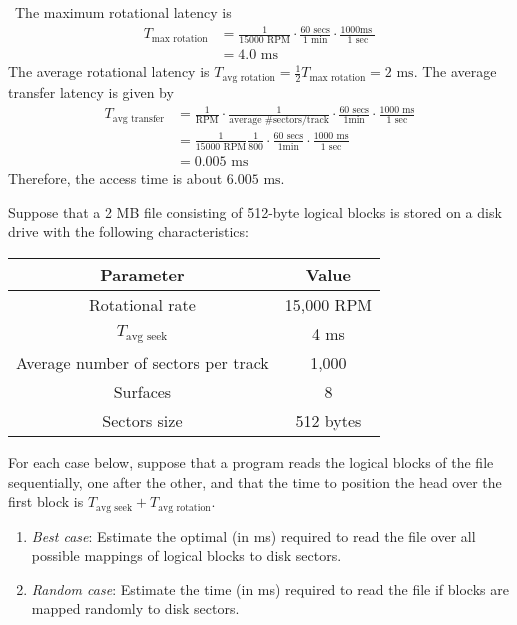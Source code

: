 \documentclass[12pt]{article}
\newenvironment{ex}[2][Exercise]{\begin{trivlist}
		\item[\hskip \labelsep {\bfseries #1}\hskip \labelsep {\bfseries #2.}]}{\end{trivlist}}
\newenvironment{sol}[1][Solution]{\begin{trivlist}
		\item[\hskip \labelsep {\bfseries #1:}]}{\end{trivlist}}
\begin{document}
\begin{sol}
	\
	The maximum rotational latency is
	\begin{align*}
		T_{\text{max rotation}}&=\frac{1}{15000\text{ RPM}}\cdot \frac{60\text{ secs}}{1\text{ min}}\cdot \frac{1000 \text{ms }}{1\text{ sec}}\\
		&=4.0\text{ ms}
	\end{align*}
	The average rotational latency is $T_{\text{avg rotation}}=\frac{1}{2}T_{\text{max rotation}}=2\text{ ms}$. The average transfer latency is given by
	\begin{align*}
		T_{\text{avg transfer}}&=\frac{1}{\text{RPM}}\cdot \frac{1}{\text{average \# sectors/track}}\cdot \frac{60 \text{ secs}}{1 \text{min}}\cdot \frac{1000 \text{ ms}}{1\text{ sec}}\\
		&=\frac{1}{15000\text{ RPM}}\frac{1}{800}\cdot \frac{60\text{ secs}}{1\text {min}}\cdot
		\frac{1000 \text{ ms}}{1\text{ sec}}\\
		&=0.005\text{ ms}
	\end{align*}
	Therefore, the access time is about $6.005\text{ ms}$.
\end{sol}

\begin{ex}{6.24}
	Suppose that a 2 MB file consisting of 512-byte logical blocks is stored on a disk drive
	with the following characteristics:
	\begin{center}
		\begin{tabular}{cc}
			Parameter & Value\\
			\hline
			Rotational rate & 15,000 RPM\\
			$T_{\text{avg seek}}$ & 4 ms\\
			Average number of sectors per track & 1,000 \\
			Surfaces & 8\\
			Sectors size & 512 bytes
		\end{tabular}
	\end{center}
	For each case below, suppose that a program reads the logical blocks of the file
	sequentially, one after the other, and that the time to position the head over
	the first block is $T_{\text{avg seek}}+T_{\text{avg rotation}}$.
	\begin{enumerate}[label=(\alph*)]
		\item \emph{Best case}: Estimate the optimal (in ms) required to read the file over
		all possible mappings of logical blocks to disk sectors.
		\item \emph{Random case}: Estimate the time (in ms) required to read the file if
		blocks are mapped randomly to disk sectors.
	\end{enumerate}
\end{ex}
\end{document}
